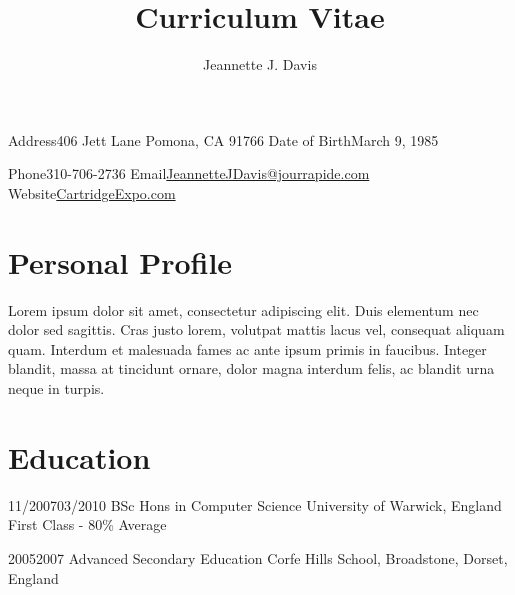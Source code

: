\documentclass[10pt]{article} %
\title{Curriculum Vitae}
\author{Jeannette J. Davis}
\begin{document}
\makecvtitle

\begin{cvinfosection}{
  \begin{cvinfo}
    {Address}{406 Jett Lane}
    {}{Pomona, CA 91766}
    {Date of Birth}{March 9, 1985}
    {}{}
  \end{cvinfo}
}
{
  \begin{cvinfo}
    {Phone}{310-706-2736}
    {Email}{\href{mailto:JeannetteJDavis@jourrapide.com}{JeannetteJDavis@jourrapide.com}}
    {Website}{\href{http://CartridgeExpo.com}{CartridgeExpo.com}}
    {}{}
  \end{cvinfo}
}
\end{cvinfosection}

\section*{Personal Profile}

Lorem ipsum dolor sit amet, consectetur adipiscing elit. Duis elementum nec dolor sed sagittis. Cras justo lorem, volutpat mattis lacus vel, consequat aliquam quam. Interdum et malesuada fames ac ante ipsum primis in faucibus. Integer blandit, massa at tincidunt ornare, dolor magna interdum felis, ac blandit urna neque in turpis.




\section*{Education}

\begin{education}
  {11/2007}{03/2010}
  {BSc Hons in Computer Science}
  {University of Warwick, England}
  {First Class - 80\% Average}
\end{education}


\begin{educationshort}
  {2005}{2007}
  {Advanced Secondary Education}
  {Corfe Hills School, Broadstone, Dorset, England}
\end{educationshort}

\end{document}
